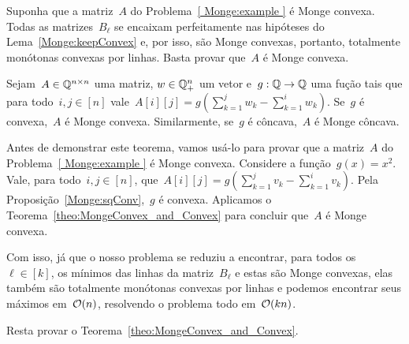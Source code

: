 Suponha que a matriz~$A$ do Problema~\ref{ Monge:example } é Monge convexa. Todas as matrizes~$B_\ell$ se encaixam perfeitamente nas hipóteses do Lema~\ref{Monge:keepConvex} e, por isso, são Monge convexas, portanto, totalmente monótonas convexas por linhas. Basta provar que~$A$ é Monge convexa.

\begin{theo} \label{theo:MongeConvex_and_Convex}
Sejam~$A \in \mathbb{Q}^{n \times n}$ uma matriz, $w \in \mathbb{Q}_+^n$ um vetor e~${g : \mathbb{Q} \to \mathbb{Q}}$ uma fução tais que para todo~$i,j \in [n]$ vale~${A[i][j] = g\left(\sum\limits_{k=1}^j w_k - \sum\limits_{k=1}^i w_k\right)}$. Se~$g$ é convexa,~$A$ é Monge convexa. Similarmente, se~$g$ é côncava,~$A$ é Monge côncava.
\end{theo}

Antes de demonstrar este teorema, vamos usá-lo para provar que a matriz~$A$ do Problema~\ref{ Monge:example } é Monge convexa. Considere a função~$g(x) = x^2$. Vale, para todo~${ i,j \in [n] }$, que~${A[i][j] = g\left(\sum\limits_{k=1}^j v_k - \sum\limits_{k=1}^i v_k \right)}$. Pela Proposição~\ref{Monge:sqConv},~$g$ é convexa. Aplicamos o Teorema~\ref{theo:MongeConvex_and_Convex} para concluir que~$A$ é Monge convexa.

Com isso, já que o nosso problema se reduziu a encontrar, para todos os~$\ell \in [k]$, os mínimos das linhas da matriz~$B_\ell$ e estas são Monge convexas, elas também são totalmente monótonas convexas por linhas e podemos encontrar seus máximos em~$\mathcal{O}(n)$, resolvendo o problema todo em~$\mathcal{O}(kn)$.

Resta provar o Teorema~\ref{theo:MongeConvex_and_Convex}.

